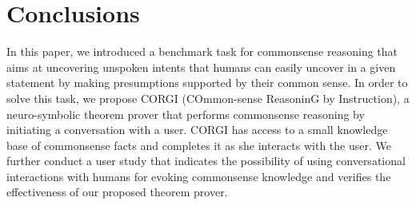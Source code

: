 \section{Conclusions}
In this paper, we introduced a benchmark task for commonsense reasoning that aims at uncovering unspoken intents that humans can easily uncover in a given statement by making presumptions supported by their common sense. In order to solve this task, we propose
CORGI (COmmon-sense ReasoninG by Instruction),  a neuro-symbolic theorem prover that performs commonsense reasoning by initiating a conversation with a user. CORGI has access to a small knowledge base of commonsense facts and completes it as she interacts with the user. We further conduct a user study that indicates the possibility of using conversational interactions with humans for evoking commonsense knowledge and verifies the effectiveness of our proposed theorem prover.
